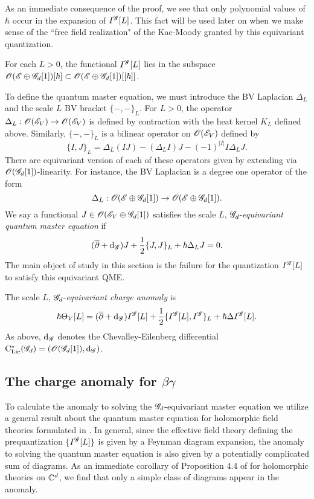 \documentclass[10pt]{amsart}
\begin{document}
As an immediate consequence of the proof, we see that only polynomial values of $\hbar$ occur in the expansion of $I^{\mathscr G}[L]$. 
This fact will be used later on when we make sense of the ``free field realization" of the Kac-Moody granted by this equivariant quantization. 

\begin{cor}
For each $L > 0$, the functional $I^{\mathscr G}[L]$ lies in the subspace $\mathscr O(\mathscr E \oplus \mathscr G_d[1]) [\hbar] \subset \mathscr O(\mathscr E \oplus \mathscr G_d[1]) [[\hbar]]$. 
\end{cor}

To define the quantum master equation, we must introduce the BV Laplacian $\Delta_L$ and the scale $L$ BV bracket $\{-,-\}_L$. 
For $L > 0$, the operator $\Delta_L : \mathscr O(\mathscr E_V) \to \mathscr O(\mathscr E_V)$ is defined by contraction with the heat kernel $K_L$ defined above. 
Similarly, $\{-,-\}_L$ is a bilinear operator on $\mathscr O(\mathscr E_V)$ defined by
\[
\{I,J\}_L = \Delta_L(IJ) - (\Delta_L I)J - (-1)^{|I|} I \Delta_L J .
\] 
There are equivariant version of each of these operators given by extending via $\mathscr O(\mathscr G_d[1])$-linearity.
For instance, the BV Laplacian is a degree one operator of the form
\[
\Delta_L : \mathscr O(\mathscr E \oplus \mathscr G_d[1]) \to \mathscr O(\mathscr E \oplus \mathscr G_d[1]) .
\]
We say a functional $J \in \mathscr O(\mathscr E_V \oplus \mathscr G_d[1])$ satisfies the scale $L$, $\mathscr G_d$-{\em equivariant quantum master equation} if
\[
(\overline{\partial} + {\rm d}_{\mathscr G}) J+ \frac{1}{2} \{J, J\}_L + \hbar \Delta_L J = 0 .
\]
The main object of study in this section is the failure for the quantization $I^{\mathscr G}[L]$ to satisfy this equivariant QME. 

\begin{dfn}
The scale $L$, $\mathscr G_d$-{\em equivariant charge anomaly} is
\[
\hbar \Theta_V [L] = (\overline{\partial} + {\rm d}_{\mathscr G}) I^{\mathscr G} [L] + \frac{1}{2} \{I^{\mathscr G}[L], I^{\mathscr G}\}_L + \hbar \Delta I^{\mathscr G}[L] .
\]
As above, ${\rm d}_{\mathscr G}$ denotes the Chevalley-Eilenberg differential ${\rm C}_{{\rm Lie}}^*(\mathscr G_d) = \left(\mathscr O(\mathscr G_d[1]), {\rm d}_{\mathscr G}\right)$. 
\end{dfn}

\subsection{The charge anomaly for $\beta\gamma$}

To calculate the anomaly to solving the $\mathscr G_d$-equivariant master equation we utilize a general result about the quantum master equation for holomorphic field theories formulated in \cite{BWhol}. 
In general, since the effective field theory defining the prequantization $\{I^{\mathscr G}[L]\}$ is given by a Feynman diagram expansion, the anomaly to solving the quantum master equation is also given by a potentially complicated sum of diagrams. 
As an immediate corollary of Proposition 4.4 of \cite{BWhol} for holomorphic theories on $\mathbb C^d$, we find that only a simple class of diagrams appear in the anomaly. 
\end{document}
